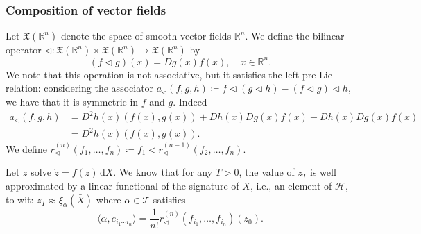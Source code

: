 \documentclass[10pt, reqno]{article}
\theoremstyle{definition}
\theoremstyle{plain}
\newcommand{\R}{\mathbb{R}}
\newcommand{\T}{\mathscr{T}}
\renewcommand{\H}{\mathscr{H}}
\begin{document}
\subsubsection{Composition of vector fields}
Let \(\mathfrak{X}(\R^n)\) denote the space of smooth vector fields \(\R^n\).
We define the bilinear operator
\(\triangleleft\colon\mathfrak{X}(\R^n)\times\mathfrak{X}(\R^n)\to\mathfrak{X}(\R^n)\)
by
\[
	(f\triangleleft g)(x)=Dg(x)f(x),\quad x\in\R^n.
\]
We note that this operation is not associative, but it satisfies the left pre-Lie relation:
considering the associator
\(a_\triangleleft(f,g,h)\coloneqq f\triangleleft(g\triangleleft h)-(f\triangleleft g)\triangleleft h\),
we have that it is symmetric in \(f\) and \(g\).
Indeed
\begin{align*}
	a_\triangleleft(f,g,h)&= D^2h(x)(f(x),g(x)) + Dh(x)Dg(x)f(x) - Dh(x)Dg(x)f(x)\\
	&= D^2h(x)(f(x),g(x)).
\end{align*}
We define \(r^{(n)}_\triangleleft(f_1,\dotsc,f_n)\coloneqq f_1\triangleleft r^{(n-1)}_\triangleleft(f_2,\dotsc,f_n)\).

Let \(z\) solve \(\dot z=f(z)\,\mathrm dX\).
We know that for any \(T>0\), the value of \(z_T\) is well approximated by a linear functional of the signature of \(\bar{X}\), i.e., an element of
\(\H\), to wit: \( z_T\approx\xi_\alpha(\bar{X}) \) where \(\alpha\in\T\) satisfies
\[
	\langle\alpha, e_{i_1\dotsm i_n}\rangle = \frac{1}{n!}r^{(n)}_\triangleleft(f_{i_1},\dotsc,f_{i_n})(z_0).
\]
\end{document}
